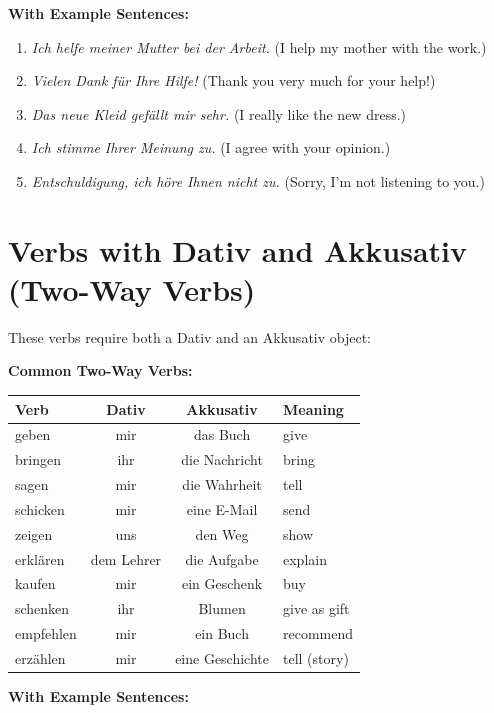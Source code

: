 \bigskip
\noindent\textbf{With Example Sentences:}

\begin{enumerate}
    \item \textit{Ich helfe meiner Mutter bei der Arbeit.} (I help my mother with the work.)
    \item \textit{Vielen Dank für Ihre Hilfe!} (Thank you very much for your help!)
    \item \textit{Das neue Kleid gefällt mir sehr.} (I really like the new dress.)
    \item \textit{Ich stimme Ihrer Meinung zu.} (I agree with your opinion.)
    \item \textit{Entschuldigung, ich höre Ihnen nicht zu.} (Sorry, I'm not listening to you.)
\end{enumerate}

\section{Verbs with Dativ and Akkusativ (Two-Way Verbs)}
\label{sec:ZweiwegVerben}

These verbs require both a Dativ and an Akkusativ object:

\bigskip
\noindent\textbf{Common Two-Way Verbs:}

\begin{center}
\begin{tabular}{|l|c|c|l|}
\hline
Verb & Dativ & Akkusativ & Meaning \\ \hline
geben & mir & das Buch & give \\ \hline
bringen & ihr & die Nachricht & bring \\ \hline
sagen & mir & die Wahrheit & tell \\ \hline
schicken & mir & eine E-Mail & send \\ \hline
zeigen & uns & den Weg & show \\ \hline
erklären & dem Lehrer & die Aufgabe & explain \\ \hline
kaufen & mir & ein Geschenk & buy \\ \hline
schenken & ihr & Blumen & give as gift \\ \hline
empfehlen & mir & ein Buch & recommend \\ \hline
erzählen & mir & eine Geschichte & tell (story) \\ \hline
\end{tabular}
\end{center}

\bigskip
\noindent\textbf{With Example Sentences:}

